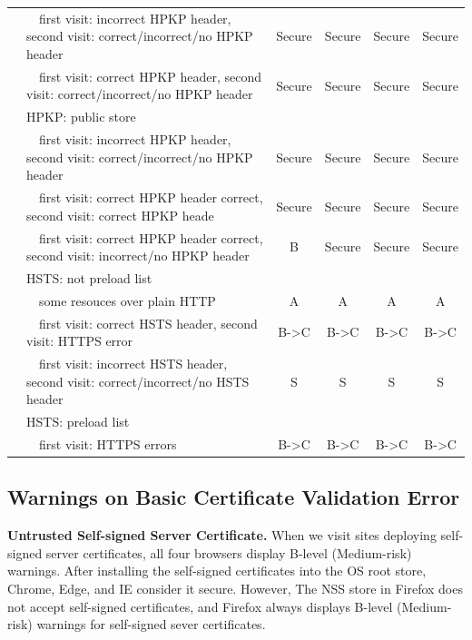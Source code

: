 \begin{table}[htbp]
\begin{tabular}{p{2.2cm}|l|cccc}
 & ~~first visit: incorrect HPKP header, second visit: correct/incorrect/no HPKP header & Secure & Secure & Secure & Secure \\
 & ~~first visit: correct HPKP header, second visit: correct/incorrect/no HPKP header & Secure & Secure & Secure & Secure \\
 & HPKP: public store &  &  &  &  \\
 & ~~first visit: incorrect HPKP header, second visit: correct/incorrect/no HPKP header & Secure & Secure & Secure & Secure \\
 & ~~first visit: correct HPKP header correct, second visit: correct HPKP heade & Secure & Secure & Secure & Secure \\
 & ~~first visit: correct HPKP header correct, second visit: incorrect/no HPKP header & B & Secure & Secure & Secure \\ \cline{2-6}
 & HSTS: not preload list &  &  &  &  \\
 & ~~some resouces over plain HTTP & A & A & A & A \\
 & ~~first visit: correct HSTS header, second visit: HTTPS error & B-\textgreater{}C & B-\textgreater{}C & B-\textgreater{}C & B-\textgreater{}C \\
 & ~~first visit: incorrect HSTS header, second visit: correct/incorrect/no HSTS header & S & S & S & S \\
 & HSTS: preload list &  &  &  &  \\
 & ~~first visit: HTTPS errors & B-\textgreater{}C & B-\textgreater{}C & B-\textgreater{}C & B-\textgreater{}C \\ \bottomrule
\end{tabular}
\end{table}%



\subsection{Warnings on Basic Certificate Validation Error}

\textbf{Untrusted Self-signed Server Certificate.}
    When we visit sites deploying self-signed server certificates, all four browsers display B-level (Medium-risk) warnings.
    After installing the self-signed certificates into the OS root store, Chrome, Edge, and IE consider it secure.
    However, The NSS store in Firefox does not accept self-signed certificates, and Firefox always displays B-level (Medium-risk) warnings for self-signed sever certificates.

